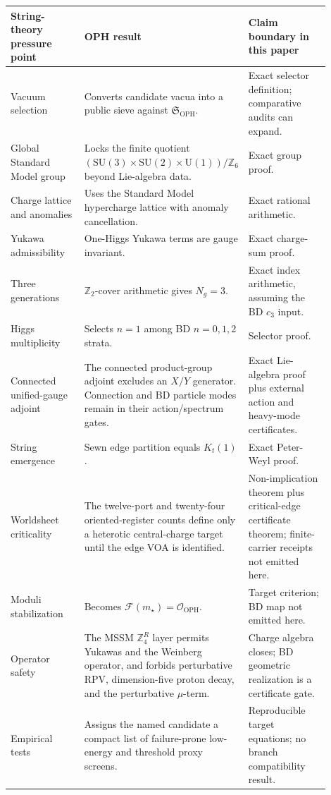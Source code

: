 \documentclass[11pt]{article}
\theoremstyle{remark}
\theoremstyle{plain}
\newcommand{\OPH}{\mathrm{OPH}}
\newcommand{\SU}{\mathrm{SU}}
\newcommand{\U}{\mathrm{U}}
\newcommand{\Z}{\mathbb Z}
\newcommand{\calF}{\mathcal F}
\newcommand{\calO}{\mathcal O}
\newcommand{\ZfourR}{\mathbb Z_4^R}
\begin{document}
\begin{longtable}{p{0.26\linewidth}p{0.34\linewidth}p{0.30\linewidth}}
\toprule
\textbf{String-theory pressure point} & \textbf{OPH result} & \textbf{Claim boundary in this paper} \\
\midrule
Vacuum selection & Converts candidate vacua into a public sieve against
\(\mathfrak S_{\OPH}\). & Exact selector definition; comparative audits can expand. \\
Global Standard Model group & Locks the finite quotient
\((\SU(3)\times\SU(2)\times\U(1))/\Z_6\) beyond Lie-algebra data. & Exact group proof. \\
Charge lattice and anomalies & Uses the Standard Model hypercharge lattice with anomaly
cancellation. & Exact rational arithmetic. \\
Yukawa admissibility & One-Higgs Yukawa terms are gauge invariant. & Exact charge-sum proof. \\
Three generations & \(\Z_2\)-cover arithmetic gives \(N_g=3\). & Exact index arithmetic,
assuming the BD \(c_3\) input. \\
Higgs multiplicity & Selects \(n=1\) among BD \(n=0,1,2\) strata. & Selector proof. \\
Connected unified-gauge adjoint & The connected product-group adjoint excludes an
\(X/Y\) generator. Connection and BD particle modes remain in their action/spectrum gates. & Exact
Lie-algebra proof plus external action and heavy-mode certificates. \\
String emergence & Sewn edge partition equals \(K_t(1)\). & Exact Peter-Weyl proof. \\
Worldsheet criticality & The twelve-port and twenty-four oriented-register counts define only a
heterotic central-charge target until the edge VOA is identified. & Non-implication theorem plus
critical-edge certificate theorem; finite-carrier receipts not emitted here. \\
Moduli stabilization & Becomes \(\calF(m_\star)=\calO_{\OPH}\). & Target criterion; BD map not emitted here. \\
Operator safety & The MSSM \(\ZfourR\) layer permits Yukawas and the Weinberg operator, and
forbids perturbative RPV, dimension-five proton decay, and the perturbative \(\mu\)-term. &
Charge algebra closes; BD geometric realization is a certificate gate. \\
Empirical tests & Assigns the named candidate a compact list of failure-prone low-energy and
threshold proxy screens. & Reproducible target equations; no branch compatibility result. \\
\bottomrule
\end{longtable}
\end{document}
